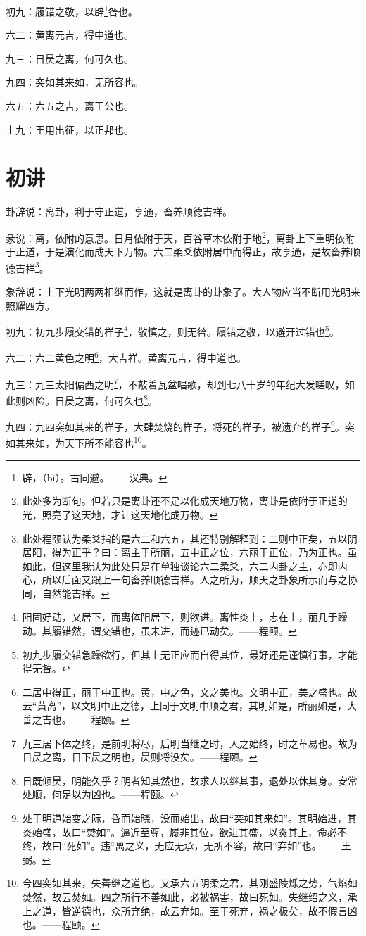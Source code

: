 \documentclass[12pt,oneside]{book}
\begin{document}
初九：履错之敬，以辟\footnote{辟，（bì）。古同避。——汉典。}咎也。

六二：黄离元吉，得中道也。

九三：日昃之离，何可久也。

九四：突如其来如，无所容也。

六五：六五之吉，离王公也。

上九：王用出征，以正邦也。

\section{初讲}
卦辞说：离卦，利于守正道，亨通，畜养顺德吉祥。

彖说：离，依附的意思。日月依附于天，百谷草木依附于地\footnote{此处多为断句。但若只是离卦还不足以化成天地万物，离卦是依附于正道的光，照亮了这天地，才让这天地化成万物。}，离卦上下重明依附于正道，于是演化而成天下万物。六二柔爻依附居中而得正，故亨通，是故畜养顺德吉祥\footnote{此处程颐认为柔爻指的是六二和六五，其还特别解释到：二则中正矣，五以阴居阳，得为正乎？曰：离主于所丽，五中正之位，六丽于正位，乃为正也。虽如此，但这里我认为此处只是在单独谈论六二柔爻，六二内卦之主，亦即内心，所以后面又跟上一句畜养顺德吉祥。人之所为，顺天之卦象所示而与之协同，自然能吉祥。}。

象辞说：上下光明两两相继而作，这就是离卦的卦象了。大人物应当不断用光明来照耀四方。


初九：初九步履交错的样子\footnote{阳固好动，又居下，而离体阳居下，则欲进。离性炎上，志在上，丽几于躁动。其履错然，谓交错也，虽未进，而迹已动矣。——程颐。}，敬慎之，则无咎。履错之敬，以避开过错也\footnote{初九步履交错急躁欲行，但其上无正应而自得其位，最好还是谨慎行事，才能得无咎。}。

六二：六二黄色之明\footnote{二居中得正，丽于中正也。黄，中之色，文之美也。文明中正，美之盛也。故云“黄离”，以文明中正之德，上同于文明中顺之君，其明如是，所丽如是，大善之吉也。——程颐。}，大吉祥。黄离元吉，得中道也。

九三：九三太阳偏西之明\footnote{九三居下体之终，是前明将尽，后明当继之时，人之始终，时之革易也。故为日昃之离，日下昃之明也，昃则将没矣。——程颐。}，不敲着瓦盆唱歌，却到七八十岁的年纪大发嗟叹，如此则凶险。日昃之离，何可久也\footnote{日既倾昃，明能久乎？明者知其然也，故求人以继其事，退处以休其身。安常处顺，何足以为凶也。——程颐。}。

九四：九四突如其来的样子，大肆焚烧的样子，将死的样子，被遗弃的样子\footnote{处于明道始变之际，昏而始晓，没而始出，故曰“突如其来如”。其明始进，其炎始盛，故曰“焚如”。逼近至尊，履非其位，欲进其盛，以炎其上，命必不终，故曰“死如”。违“离之义，无应无承，无所不容，故曰“弃如”也。——王弼。}。突如其来如，为天下所不能容也\footnote{今四突如其来，失善继之道也。又承六五阴柔之君，其刚盛陵烁之势，气焰如焚然，故云焚如。四之所行不善如此，必被祸害，故曰死如。失继绍之义，承上之道，皆逆德也，众所弃绝，故云弃如。至于死弃，祸之极矣，故不假言凶也。——程颐。}。
\end{document}
